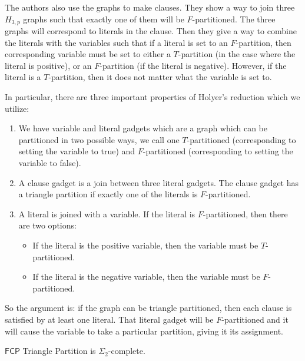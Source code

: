 \documentclass[runningheads,a4paper]{llncs}
\begin{document}
The authors also use the graphs to make clauses. They show a way to join three $H_{3,p}$ graphs such that exactly one of them will be $F$-partitioned. The three graphs will correspond to literals in the clause. Then they give a way to combine the literals with the variables such that if a literal is set to an $F$-partition, then corresponding variable must be set to either a $T$-partition (in the case where the literal is positive), or an $F$-partition (if the literal is negative). However, if the literal is a $T$-partition, then it does not matter what the variable is set to. 

In particular, there are three important properties of Holyer's reduction which we utilize:
\begin{enumerate}
\item We have variable and literal gadgets which are a graph which can be partitioned in two possible ways, we call one $T$-partitioned (corresponding to setting the variable to true) and $F$-partitioned (corresponding to setting the variable to false).  
\item A clause gadget is a join between three literal gadgets. The clause gadget has a triangle partition if exactly one of the literals is $F$-partitioned.
\item A literal is joined with a variable. If the literal is $F$-partitioned, then there are two options:
\begin{itemize}
\item If the literal is the positive variable, then the variable must be $T$-partitioned.
\item If the literal is the negative variable, then the variable must be $F$-partitioned.
\end{itemize}
\end{enumerate}
So the argument is: if the graph can be triangle partitioned, then each clause is satisfied by at least one literal. That literal gadget will be $F$-partitioned and it will cause the variable to take a particular partition, giving it its assignment. 

\begin{theorem}
$\mathsf{FCP}$ Triangle Partition is $\Sigma_2$-complete.
\end{theorem}
\end{document}
